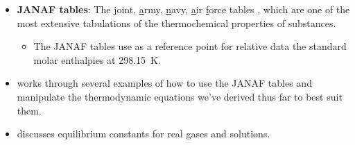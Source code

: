\documentclass[../notes.tex]{subfiles}
\begin{document}
\begin{itemize}
    \item \textbf{JANAF tables}: The \underline{j}oint, \underline{a}rmy, \underline{n}avy, \underline{a}ir \underline{f}orce tables \parencite{bib:JANAFtables}, which are one of the most extensive tabulations of the thermochemical properties of substances.
    \begin{itemize}
        \item The JANAF tables use as a reference point for relative data the standard molar enthalpies at \SI{298.15}{\kelvin}.
    \end{itemize}
    \item \textcite{bib:McQuarrieSimon} works through several examples of how to use the JANAF tables and manipulate the thermodynamic equations we've derived thus far to best suit them.
    \item \textcite{bib:McQuarrieSimon} discusses equilibrium constants for real gases and solutions.
\end{itemize}
\end{document}
